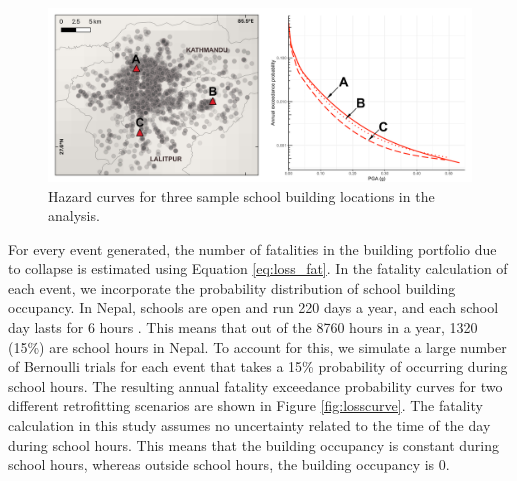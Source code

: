 \begin{figure}[h!] 
\begin{center}
    \includegraphics[width=\linewidth]{Figures/hazcurves-v5.png}
	\caption{Hazard curves for three sample school building locations in the analysis.}
	\label{fig:hazcurve}
\end{center}
\end{figure}

For every event generated, the number of fatalities in the building portfolio due to collapse is estimated using Equation \ref{eq:loss_fat}. In the fatality calculation of each event, we incorporate the probability distribution of school building occupancy. In Nepal, schools are open and run 220 days a year, and each school day lasts for 6 hours \citep{nepal2009reform}. This means that out of the 8760 hours in a year, 1320 (15\%) are school hours in Nepal. To account for this, we simulate a large number of Bernoulli trials for each event that takes a 15\% probability of occurring during school hours. The resulting annual fatality exceedance probability curves for two different retrofitting scenarios are shown in Figure \ref{fig:losscurve}. The fatality calculation in this study assumes no uncertainty related to the time of the day during school hours. This means that the building occupancy is constant during school hours, whereas outside school hours, the building occupancy is 0.

